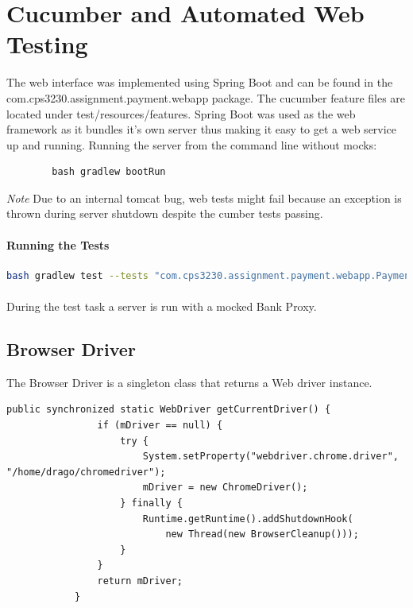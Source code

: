 \documentclass[11pt, a4paper]{article}
\begin{document}
\section{Cucumber and Automated Web Testing}
    The web interface was implemented using Spring Boot and can be found in the com.cps3230.assignment.payment.webapp package. The cucumber feature files are located under test/resources/features. Spring Boot was used as the web framework as it bundles it's own server thus making it easy to get a web service up and running.
    Running the server from the command line without mocks:
    \begin{verbatim}
        bash gradlew bootRun
    \end{verbatim}
    \emph{Note} Due to an internal tomcat bug, web tests might fail because an exception is thrown during server shutdown despite the cumber tests passing.

    \paragraph{Running the Tests}
    \begin{lstlisting}[language=bash]
        bash gradlew test --tests "com.cps3230.assignment.payment.webapp.PaymentProcessorWebTests"
    \end{lstlisting}
    
    \paragraph{} During the test task a server is run with a mocked Bank Proxy. 
    \subsection{Browser Driver}
        The Browser Driver is a singleton class that returns a Web driver instance.
        \begin{lstlisting}[caption=Getting a Web Driver Instance]
            public synchronized static WebDriver getCurrentDriver() {
                if (mDriver == null) {
                    try {
                        System.setProperty("webdriver.chrome.driver", "/home/drago/chromedriver");
                        mDriver = new ChromeDriver();
                    } finally {
                        Runtime.getRuntime().addShutdownHook(
                            new Thread(new BrowserCleanup()));
                    }
                }
                return mDriver;
            }
        \end{lstlisting}
\end{document}
